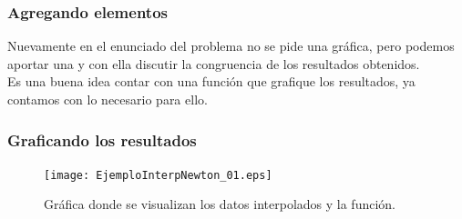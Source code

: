 \begin{frame}
\frametitle{Agregando elementos}
Nuevamente en el enunciado del problema no se pide una gráfica, pero podemos aportar una y con ella discutir la congruencia de los resultados obtenidos.
\\
\bigskip
Es una buena idea contar con una función que grafique los resultados, ya contamos con lo necesario para ello.
\end{frame}
\begin{frame}
\frametitle{Graficando los resultados}
\begin{figure}
	\centering
	\texttt{[image: EjemploInterpNewton\_01.eps]}
	\caption{Gráfica donde se visualizan los datos interpolados y la función.}
\end{figure}
\end{frame}
